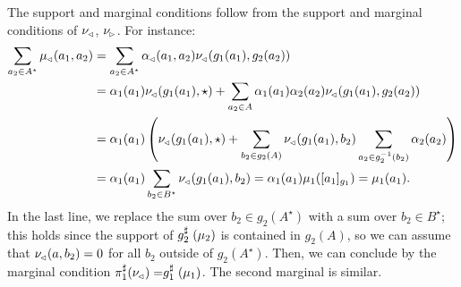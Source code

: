 \documentclass{lmcs}
\begin{document}
%
  The support and marginal conditions follow from the support and marginal
  conditions of $\nu\lside$, $\nu\rside$. For instance:
  \begin{align*}
    \sum_{a_2 \in A^\star} \mu\lside(a_1, a_2)
    &= \sum_{a_2 \in A^\star} \alpha\lside(a_1, a_2) \nu\lside(g_1(a_1), g_2(a_2)) \\
    &= \alpha_1(a_1) \nu\lside(g_1(a_1), \star)
    + \sum_{a_2 \in A}
    \alpha_1(a_1) \alpha_2(a_2) \nu\lside(g_1(a_1), g_2(a_2)) \\
    &= \alpha_1(a_1) \left( \nu\lside(g_1(a_1), \star)
      + \sum_{b_2 \in g_2(A)} \nu\lside(g_1(a_1), b_2) \sum_{a_2 \in g_2^{-1}(b_2)}
    \alpha_2(a_2) \right) \\
    &= \alpha_1(a_1) \sum_{b_2 \in B^\star} \nu\lside(g_1(a_1), b_2)
    = \alpha_1(a_1) \mu_1([a_1]_{g_1})
    = \mu_1(a_1) .
  \end{align*}
  In the last line, we replace the sum over $b_2 \in g_2(A^\star)$ with a sum
  over $b_2 \in B^\star$; this holds since the support of $\lift{g_2}(\mu_2)$ is
  contained in $g_2(A)$, so we can assume that $\nu\lside(a, b_2) = 0$ for all $b_2$
  outside of $g_2(A^\star)$. Then, we can conclude by the marginal condition
  $\dfst(\nu\lside) = \lift{g_1}(\mu_1)$. The second marginal is similar.
\end{document}
